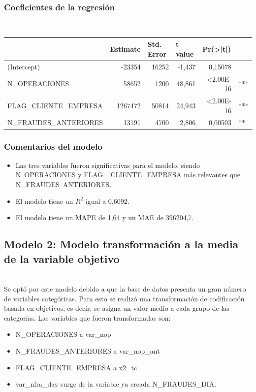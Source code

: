 \documentclass[
	11pt, %
	spanish, %
]{fphw}
\begin{document}
\subsubsection*{Coeficientes de la regresión} \hfill \\
\begin{table}[h!]
\centering
\label{coef1}
\begin{tabular}{lrrrrl}
\hline
 & \multicolumn{1}{l}{\textbf{Estimate}} & \multicolumn{1}{l}{\textbf{Std. Error}} & \multicolumn{1}{l}{\textbf{t value}} & \multicolumn{1}{l}{\textbf{Pr(\textgreater{}|t|)}} &  \\ \hline
(Intercept) & -23354 & 16252 & -1,437 & 0,15078 &  \\
N\_OPERACIONES & 58652 & 1200 & 48,861 & \textless{}2.00E-16 & *** \\
FLAG\_CLIENTE\_EMPRESA & 1267472 & 50814 & 24,943 & \textless{}2.00E-16 & *** \\
N\_FRAUDES\_ANTERIORES & 13191 & 4700 & 2,806 & 0,00503 & **
\end{tabular}
\end{table}

\subsubsection*{Comentarios del modelo}
\begin{itemize}
\item Las tres variables fueron significativas para el modelo, siendo N\ OPERACIONES y FLAG\_ CLIENTE\_EMPRESA más relevantes que N\_FRAUDES\ ANTERIORES. 
\item El modelo tiene un $R^{2}$ igual a 0,6092.
\item El modelo tiene un MAPE de 1,64 y un MAE de 396204,7.
\end{itemize}

\newpage
\subsection*{Modelo 2: Modelo transformación a la media de la variable objetivo}
\hfill\\
Se optó por este modelo debido a que la base de datos presenta un gran número de variables categóricas. Para esto se realizó una transformación de codificación basada en objetivos, es decir, se asigna un valor medio a cada grupo de las categorías. Las variables que fueron transformadas son: 
\begin{itemize}
\item N\_OPERACIONES a var\_nop
\item N\_FRAUDES\_ANTERIORES a var\_nop\_ant
\item FLAG\_CLIENTE\_EMPRESA a x2\_tc
\item var\_nfra\_day surge de la variable ya creada N\_FRAUDES\_DIA.
\end{itemize}
\end{document}
